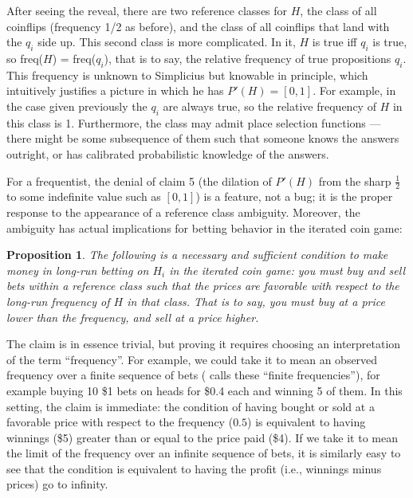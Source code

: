 \documentclass[letterpaper,12pt]{article}
\newtheorem{proposition}{Proposition}
\begin{document}
After seeing the reveal, there are two reference classes for $H$, the class of all coinflips (frequency 1/2 as before), and the class of all coinflips that land with the $q_i$ side up. This second class is more complicated. In it, $H$ is true iff $q_i$ is true, so freq($H$) = freq($q_i$), that is to say, the relative frequency of true propositions $q_i$. This frequency is unknown to Simplicius but knowable in principle, which intuitively justifies a picture in which he has $P'(H) = [0, 1]$. For example, in the case given previously the $q_i$ are always true, so the relative frequency of $H$ in this class is 1. Furthermore, the class may admit place selection functions --- there might be some subsequence of them such that someone knows the answers outright, or has calibrated probabilistic knowledge of the answers.

For a frequentist, the denial of claim 5 (the dilation of $P'(H)$ from the sharp $\frac{1}{2}$ to some indefinite value such as $[0, 1]$) is a feature, not a bug; it is the proper response to the appearance of a reference class ambiguity. Moreover, the ambiguity has actual implications for betting behavior in the iterated coin game:

\begin{proposition}
\label{proposition:iff}
The following is a necessary and sufficient condition to make money in long-run betting on $H_i$ in the iterated coin game: you must buy and sell bets within a reference class such that the prices are favorable with respect to the long-run frequency of $H$ in that class. That is to say, you must buy at a price lower than the frequency, and sell at a price higher.
\end{proposition}

The claim is in essence trivial, but proving it requires choosing an interpretation of the term ``frequency''. For example, we could take it to mean an observed frequency over a finite sequence of bets (\cite{Hajek1996-HJEMR} calls these ``finite frequencies''), for example buying 10 \$1 bets on heads for \$0.4 each and winning 5 of them. In this setting, the claim is immediate: the condition of having bought or sold at a favorable price with respect to the frequency ($0.5$) is equivalent to having winnings (\$5) greater than or equal to the price paid (\$4). If we take it to mean the limit of the frequency over an infinite sequence of bets, it is similarly easy to see that the condition is equivalent to having the profit (i.e., winnings minus prices) go to infinity. %
\end{document}
